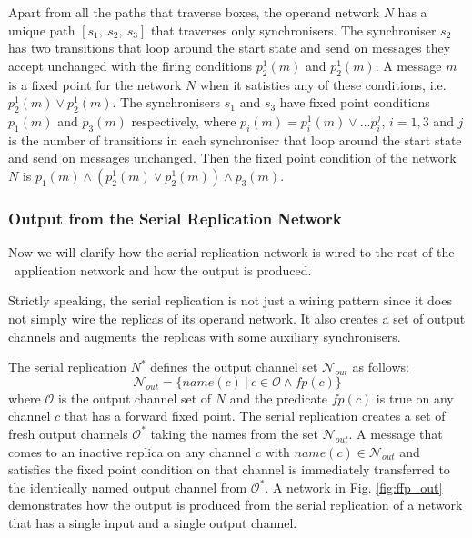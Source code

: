 Apart from all the paths that traverse boxes, the operand network $N$ has a unique path $[s_1, \: s_2, \: s_3]$ that traverses only synchronisers. The synchroniser $s_2$ has two transitions that loop around the start state and send on messages they accept unchanged with the firing conditions $p^{1}_2(m)$ and $p^{1}_2(m)$. A message $m$ is a fixed point for the network $N$ when it satisties any of these conditions, i.e. $p^{1}_2(m) \lor p^{1}_2(m)$. The synchronisers $s_1$ and $s_3$ have fixed point conditions $p_1(m)$ and $p_3(m)$ respectively, where $p_i(m) = p^{1}_i(m) \lor \dots p^{j}_i$, $i=1,3$ and $j$ is the number of transitions in each synchroniser that loop around the start state and send on messages unchanged. Then the fixed point condition of the network $N$ is $p_1(m) \land (p^{1}_2(m) \lor p^{1}_2(m)) \land p_3(m)$.


    \subsubsection{Output from the Serial Replication Network}
Now we will clarify how the serial replication network is wired to the rest of the \ak\ application network and how the output is produced.

Strictly speaking, the serial replication is not just a wiring pattern since it does not simply wire the replicas of its operand network. It also creates a set of output channels and augments the replicas with some auxiliary synchronisers.


The serial replication $N^{*}$ defines the output channel set $\mathcal{N}_{out}$ as follows:
\begin{equation}
\mathcal{N}_{out} = \{ name(c) \: | \: c \in \mathcal{O} \land fp(c) \}\nonumber
\end{equation}
where $\mathcal{O}$ is the output channel set of $N$ and the predicate $fp(c)$ is true on any channel $c$ that has a forward fixed point. The serial replication creates a set of fresh output channels $\mathcal{O}^{*}$ taking the names from the set $\mathcal{N}_{out}$. A message that comes to an inactive replica on any channel $c$ with $name(c) \in \mathcal{N}_{out}$ and satisfies the fixed point condition on that channel is immediately transferred to the identically named output channel from $\mathcal{O}^{*}$. A network in Fig. \ref{fig:ffp_out} demonstrates how the output is produced from the serial replication of a network that has a single input and a single output channel.


